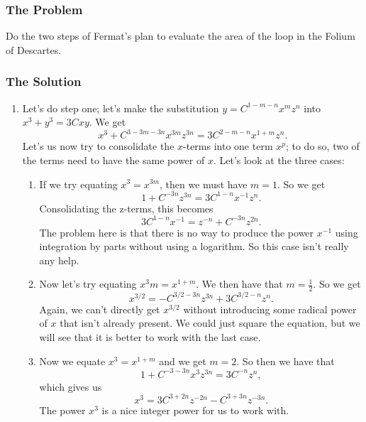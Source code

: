 \subsubsection*{The Problem}

Do the two steps of Fermat's plan to evaluate the area of the loop in the Folium of Descartes.

\subsubsection*{The Solution}

\begin{enumerate}
\item Let's do step one; let's make the substitution \(y = C^{1 - m - n} x^m z^n\) into \(x^3 + y^3 = 3Cxy\). We get
\begin{equation}
x^3 + C^{3 - 3m - 3n} x^{3m} z^{3n} = 3C^{2 - m - n} x^{1 + m} z^n.
\end{equation}
Let's us now try to consolidate the \(x\)-terms into one term \(x^p\); to do so, two of the terms need to have the same power of \(x\). 
Let's look at the three cases:
    \begin{enumerate}
    \item If we try equating \(x^3 = x^{3m}\), then we must have \(m = 1\). So we get
    \begin{equation}
    1 + C^{-3n} z^{3n} = 3C^{1 - n} x^{-1} z^n.
    \end{equation} 
    Consolidating the z-terms, this becomes
    \begin{equation}
    3C^{1 - n} x^{-1} = z^{-n} + C^{-3n} z^{2n}.
    \end{equation}
    The problem here is that there is no way to produce the power \(x^{-1}\) using integration by parts without using a logarithm. So
    this case isn't really any help.

    \item Now let's try equating \(x^3m = x^{1 + m}\). We then have that \(m = \frac{1}{2}\). So we get
    \begin{equation}
    x^{3/2} = -C^{3/2 - 3n} z^{3n} + 3 C^{3/2 - n} z^n.
    \end{equation}   
    Again, we can't directly get \(x^{3/2}\) without introducing some radical power of \(x\) that isn't already present. We could just
    square the equation, but we will see that it is better to work with the last case.

    \item Now we equate \(x^3 = x^{1 + m}\) and we get \(m = 2\). So then we have that
    \begin{equation}
    1 + C^{-3 - 3n} x^3 z^{3n} = 3C^{-n} z^n,
    \end{equation}
    which gives us
    \begin{equation}
    x^3 = 3C^{3 + 2n} z^{-2n} -C^{3 + 3n} z^{-3n}. 
    \end{equation}
    The power \(x^3\) is a nice integer power for us to work with.
    \end{enumerate}


\end{enumerate}
